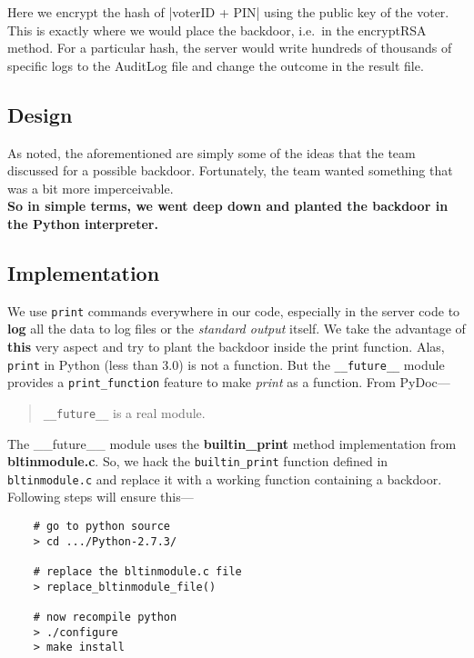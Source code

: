 Here we encrypt the hash of \DefineShortVerb{\|}|voterID + PIN| \UndefineShortVerb{\|}using the public key of the voter. This is exactly where we would place the backdoor, i.e.\ in the encryptRSA method. For a particular hash, the server would write hundreds of thousands of specific logs to the AuditLog file and change the outcome in the result file.
	
\subsection{Design}

As noted, the aforementioned are simply some of the ideas that the team discussed for a possible backdoor. Fortunately, the team wanted something that was a bit more imperceivable.\\

\textbf{So in simple terms, we went deep down and planted the backdoor in the Python interpreter.}

\subsection{Implementation}

We use \verb+print+ commands everywhere in our code, especially in the server code to \textbf{log} all the data to log files or the \emph{standard output} itself. We take the advantage of \textbf{this} very aspect and try to plant the backdoor inside the print function. Alas, \verb+print+ in Python (less than 3.0) is not a function. But the \verb+__future__+ module provides a \lstinline|print_function| feature to make \emph{print} as a function. From PyDoc--- 

\begin{quotation}
	{\verb+__future__+ is a real module}.
\end{quotation}

The \_\_future\_\_ module uses the \textbf{builtin\_print} method implementation from \textbf{bltinmodule.c}. So, we hack the \verb+builtin_print+ function defined in \verb+bltinmodule.c+ and replace it with a working function containing a backdoor.\\

\noindent Following steps will ensure this---
\begin{verbatim}
	# go to python source
	> cd .../Python-2.7.3/
	
	# replace the bltinmodule.c file
	> replace_bltinmodule_file()
	
	# now recompile python
	> ./configure
	> make install
\end{verbatim}


